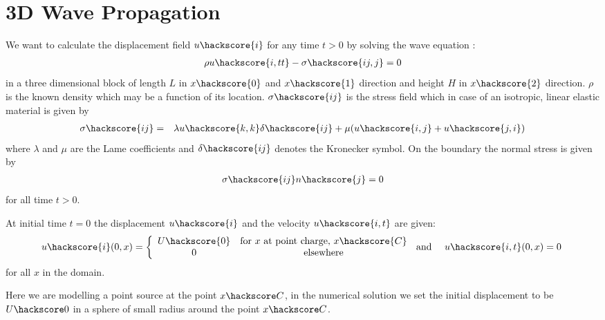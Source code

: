 %
%
\section{3D Wave Propagation}
\label{WAVE CHAP}

We want to calculate the displacement field $u\hackscore{i}$ for any time $t>0$ by solving the wave equation
:
\begin{eqnarray}\label{WAVE general problem}
\rho u\hackscore{i,tt} - \sigma\hackscore{ij,j}=0
\end{eqnarray}
in a three dimensional block of length $L$ in $x\hackscore{0}$
and $x\hackscore{1}$ direction and height $H$
in $x\hackscore{2}$ direction. $\rho$ is the known density which may be a function of its location.
$\sigma\hackscore{ij}$ is the stress field  which in case of an isotropic, linear elastic material is given by
\begin{eqnarray} \label{WAVE stress}
\sigma\hackscore{ij} & = & \lambda u\hackscore{k,k} \delta\hackscore{ij} + \mu ( u\hackscore{i,j} + u\hackscore{j,i})
\end{eqnarray}
where $\lambda$ and $\mu$ are the Lame coefficients 
 and $\delta\hackscore{ij}$ denotes the Kronecker symbol.
On the boundary the normal stress is given by
\begin{eqnarray} \label{WAVE natural}
\sigma\hackscore{ij}n\hackscore{j}=0
\end{eqnarray}
for all time $t>0$. 

At initial time $t=0$ the displacement 
$u\hackscore{i}$ and the velocity $u\hackscore{i,t}$ are given:
\begin{eqnarray} \label{WAVE initial}
u\hackscore{i}(0,x)= \left\{\begin{array}{cc} U\hackscore{0} & \mbox{for $x$ at point charge, $x\hackscore{C}$} \\ 0 & \mbox{elsewhere}\end{array}  \right. & \mbox{ and } & u\hackscore{i,t}(0,x)=0 \; 
\end{eqnarray}
for all $x$ in the domain. 

Here we are modelling a point source at the point $x\hackscore C$, in the numerical solution we
 set the initial displacement to be $U\hackscore 0$ in a sphere of small radius around the point
 $x\hackscore C$.  

